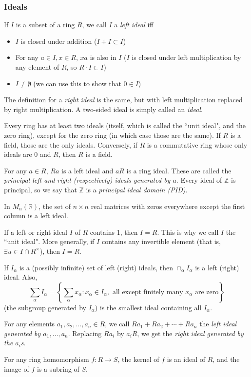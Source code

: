 \documentclass[12pt]{article}
\begin{document}
\subsubsection{Ideals}
If $I$ is a subset of a ring $R$, we call $I$ a \textit{left ideal} iff
\begin{itemize}
    \item $I$ is closed under addition ($I+I\subset I$)
    \item For any $a\in I, x \in R$, $xa$ is also in $I$ ($I$ is closed under left multiplication by any element of $R$, so $R\cdot I \subset I$)
    \item $I \neq \emptyset$ (we can use this to show that $0 \in I$)
\end{itemize}
The definition for a \textit{right ideal} is the same, but with left multiplication replaced by right multiplication. A two-sided ideal is simply called an \textit{ideal}.
\par
Every ring has at least two ideals (itself, which is called the ``unit ideal", and the zero ring), except for the zero ring (in which case those are the same). If $R$ is a field, those are the only ideals. Conversely, if $R$ is a commutative ring whose only ideals are $0$ and $R$, then $R$ is a field.
\par
For any $a \in R$, $Ra$ is a left ideal and $aR$ is a ring ideal. These are called the \textit{principal left and right (respectively) ideals generated by $a$}. Every ideal of $ \mathbb{Z}$ is principal, so we say that $ \mathbb{Z}$ is a \textit{principal ideal domain (PID)}.
\par
In $M_n( \mathbb{R})$, the set of $n \times n$ real matrices with zeros everywhere except the first column is a left ideal.
\par
If a left or right ideal $I$ of $R$ contains 1, then $I=R$. This is why we call $I$ the ``unit ideal". More generally, if $I$ contains any invertible element (that is, $\exists u \in I \cap R^\times$), then $I=R$.
\par
If $I_\alpha$ is a (possibly infinite) set of left (right) ideals, then $\cap_\alpha I_\alpha$ is a left (right) ideal. Also,
\[ \sum_\alpha I_\alpha = \left\{ \sum_\alpha x_\alpha : x_\alpha \in I_\alpha, \text{ all except finitely many $x_\alpha$ are zero} \right\} \]
(the subgroup generated by $I_\alpha$) is the smallest ideal containing all $I_\alpha$.
\par
For any elements $a_1, a_2, \dots, a_n \in R$, we call $Ra_1 + Ra_2 + \cdots + Ra_n$ the \textit{left ideal generated by $a_1, \dots, a_n$}. Replacing $Ra_i$ by $a_iR$, we get the \textit{right ideal generated by the $a_i$s}.
\par
For any ring homomorphism $f: R \rightarrow S$, the kernel of $f$ is an ideal of $R$, and the image of $f$ is a subring of $S$.
\end{document}
